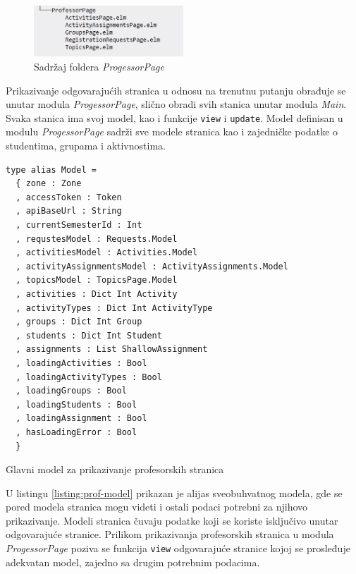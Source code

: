 \documentclass[12pt,oneside]{memoir}
\begin{document}
\begin{figure}[!ht]
  \centering
  \includegraphics[width=0.5\textwidth]{prof-page-dir.png}
  \caption{Sadržaj foldera \emph{ProgessorPage}}
  \label{fig:prof-dir}
\end{figure}

Prikazivanje odgovarajućih stranica u odnosu na trenutnu putanju obrađuje se unutar modula
\emph{ProgessorPage}, slično obradi svih stanica unutar modula \emph{Main}. 
Svaka stanica ima svoj model, kao i funkcije \texttt{view} i \texttt{update}.
Model definisan u modulu \emph{ProgessorPage} sadrži sve modele stranica
kao i zajedničke podatke o studentima, grupama i aktivnostima. 
\begin{listing}[h]
\begin{verbatim}
type alias Model =
  { zone : Zone
  , accessToken : Token
  , apiBaseUrl : String
  , currentSemesterId : Int
  , requstesModel : Requests.Model
  , activitiesModel : Activities.Model
  , activityAssignmentsModel : ActivityAssignments.Model
  , topicsModel : TopicsPage.Model
  , activities : Dict Int Activity
  , activityTypes : Dict Int ActivityType
  , groups : Dict Int Group
  , students : Dict Int Student
  , assignments : List ShallowAssignment
  , loadingActivities : Bool
  , loadingActivityTypes : Bool
  , loadingGroups : Bool
  , loadingStudents : Bool
  , loadingAssignment : Bool
  , hasLoadingError : Bool
  }
\end{verbatim}
\caption{Glavni model za prikazivanje profesorskih stranica}
\label{listing:prof-model}
\end{listing}
U listingu \ref{listing:prof-model} prikazan je alijas sveobuhvatnog modela, gde se pored
modela stranica mogu videti i ostali podaci potrebni za njihovo prikazivanje.
Modeli stranica čuvaju podatke koji se koriste isključivo unutar odgovarajuće stranice.
Prilikom prikazivanja profesorskih stranica u modula \emph{ProgessorPage}
poziva se funkcija \texttt{view} odgovarajuće stranice kojoj se prosleđuje adekvatan
model, zajedno sa drugim potrebnim podacima.
\end{document}
